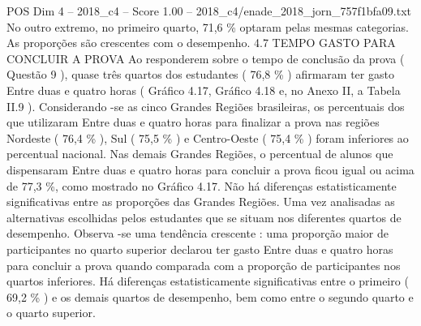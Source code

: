 \begin{textsample}{POS Dim 4 – 2018\_c4 – Score 1.00 – 2018\_c4/enade\_2018\_jorn\_757f1bfa09.txt}
No outro extremo, no primeiro quarto, 71,6 \% optaram pelas mesmas categorias.
As proporções são crescentes com o desempenho. 4.7 TEMPO GASTO PARA CONCLUIR A PROVA Ao responderem sobre o tempo de conclusão da prova ( Questão 9 ), quase três quartos dos estudantes ( 76,8 \% ) afirmaram ter gasto Entre duas e quatro horas ( Gráfico 4.17, Gráfico 4.18 e, no Anexo II, a Tabela II.9 ).
Considerando -se as cinco Grandes Regiões brasileiras, os percentuais dos que utilizaram Entre duas e quatro horas para finalizar a prova nas regiões Nordeste ( 76,4 \% ), Sul ( 75,5 \% ) e Centro-Oeste ( 75,4 \% ) foram inferiores ao percentual nacional.
Nas demais Grandes Regiões, o percentual de alunos que dispensaram Entre duas e quatro horas para concluir a prova ficou igual ou acima de 77,3 \%, como mostrado no Gráfico 4.17.
Não há diferenças estatisticamente significativas entre as proporções das Grandes Regiões.
Uma vez analisadas as alternativas escolhidas pelos estudantes que se situam nos diferentes quartos de desempenho.
Observa -se uma tendência crescente : uma proporção maior de participantes no quarto superior declarou ter gasto Entre duas e quatro horas para concluir a prova quando comparada com a proporção de participantes nos quartos inferiores.
Há diferenças estatisticamente significativas entre o primeiro ( 69,2 \% ) e os demais quartos de desempenho, bem como entre o segundo quarto e o quarto superior.

\end{textsample}

